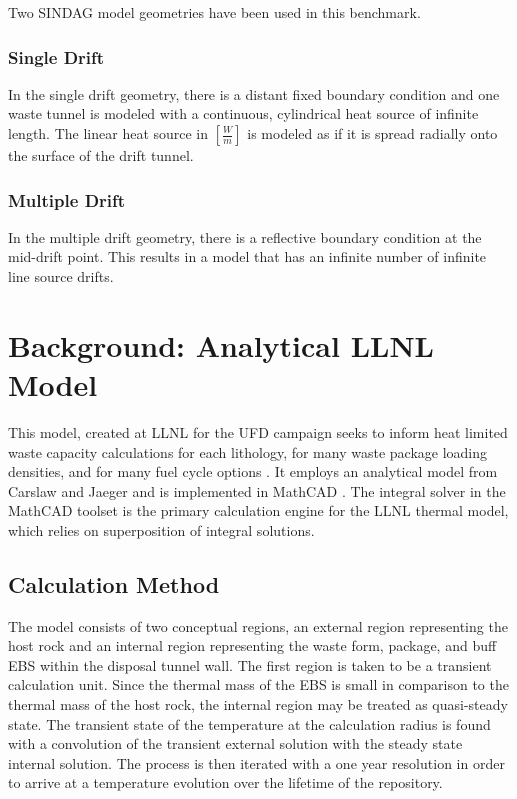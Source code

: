 \documentclass{anstrans}
\begin{document}
Two \gls{SINDAG} model geometries have been used in this benchmark.  

\subsubsection{Single Drift}

In the single drift geometry, there is a distant fixed boundary condition and 
one waste tunnel is modeled with a continuous, cylindrical heat source of 
infinite length. The linear heat source in $[\frac{W}{m}]$ is modeled as if it 
is spread radially onto the surface of the drift tunnel. 

\subsubsection{Multiple Drift}

In the multiple drift geometry, there is a reflective boundary condition at the 
mid-drift point. This results in a model that has an infinite number of infinite 
line source drifts.

\section{Background: Analytical LLNL Model}

This model, created at \gls{LLNL} for the \gls{UFD} campaign seeks to inform 
heat limited waste capacity calculations for each lithology, for many waste 
package loading densities, and for many fuel cycle options 
\cite{hardin_generic_2011, sutton_investigations_2011, 
greenberg_application_2012}. It employs an analytical model from Carslaw and 
Jaeger and is implemented in MathCAD \cite{carslaw_conduction_1959, ptc_mathcad_2010}.  The integral solver in the MathCAD toolset is the primary 
calculation engine for the LLNL thermal model, which relies on superposition of 
integral solutions.  

\subsection{Calculation Method}

The model consists of two conceptual regions, an external region representing 
the host rock and an internal region representing the waste form, package, and 
buff \gls{EBS} within the disposal tunnel wall. The first region is taken to be  
a transient calculation unit.  Since the thermal mass of the \gls{EBS} is small 
in comparison to the thermal mass of the host rock, the internal region may be 
treated as quasi-steady state. The transient state of the temperature at the 
calculation radius is found with a convolution of the transient external 
solution with the steady state internal solution.  The process is then iterated 
with a one year resolution in order to arrive at a temperature evolution over 
the lifetime of the repository. 
\end{document}
